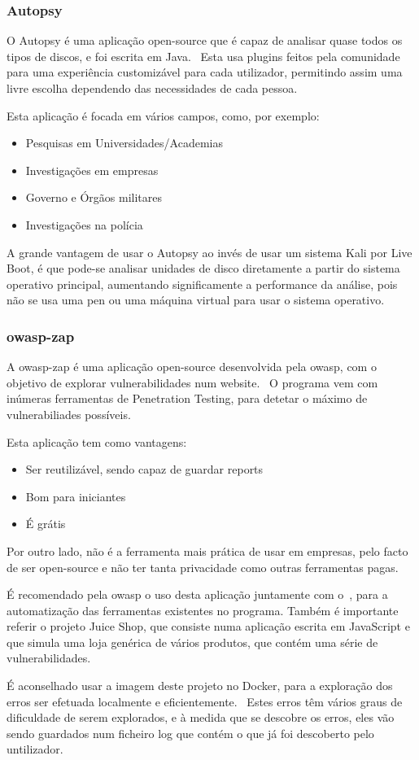 \documentclass{report}
\begin{document}
\subsubsection{Autopsy}
\label{subsubsec:autopsy}
O Autopsy é uma aplicação open-source que é capaz de analisar quase todos os tipos de discos, e foi escrita em Java. \ Esta usa plugins feitos pela comunidade para uma experiência customizável para cada utilizador, permitindo assim uma livre escolha dependendo das necessidades de cada pessoa. \par
Esta aplicação é focada em vários campos, como, por exemplo:
\begin{itemize}
    \item Pesquisas em Universidades/Academias
    \item Investigações em empresas
    \item Governo e Órgãos militares
    \item Investigações na polícia
\end{itemize}
A grande vantagem de usar o Autopsy ao invés de usar um sistema Kali por Live Boot, é que pode-se analisar unidades de disco diretamente a partir do sistema operativo principal, aumentando significamente a performance da análise, pois não se usa uma pen ou uma máquina virtual para usar o sistema operativo.

\subsubsection{\ac{owasp-zap}}
\label{subsubsec:owasp-zap}
A \ac{owasp-zap} é uma aplicação open-source desenvolvida pela \ac{owasp}, com o objetivo de explorar vulnerabilidades num website. \ O programa vem com inúmeras ferramentas de Penetration Testing, para detetar o máximo de vulnerabiliades possíveis. \par
Esta aplicação tem como vantagens:
\begin{itemize}
    \item Ser reutilizável, sendo capaz de guardar reports
    \item Bom para iniciantes
    \item É grátis
\end{itemize}
Por outro lado, não é a ferramenta mais prática de usar em empresas, pelo facto de ser open-source e não ter tanta privacidade como outras ferramentas pagas. \par
É recomendado pela \ac{owasp} o uso desta aplicação juntamente com o~, para a automatização das ferramentas existentes no programa. \bigskip
Também é importante referir o projeto Juice Shop, que consiste numa aplicação escrita em JavaScript e que simula uma loja genérica de vários produtos, que contém uma série de vulnerabilidades. \par
É aconselhado usar a imagem deste projeto no Docker, para a exploração dos erros ser efetuada localmente e eficientemente. \ Estes erros têm vários graus de dificuldade de serem explorados, e à medida que se descobre os erros, eles vão sendo guardados num ficheiro log que contém o que já foi descoberto pelo untilizador.
\end{document}
